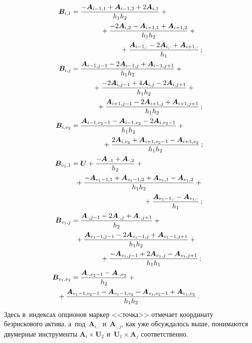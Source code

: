 \begin{multicols}{2}
\noindent
  \begin{align*}
   \bm{B}_{i,1}&= \fr{ -\bm{A}_{i-1,1} +\bm{A}_{i-1,2} +2\bm{A}_{i,1}}{h_1h_2}+{}\\
  &\hspace*{15mm}{}+   \fr{ -2\bm{A}_{i,2} -\bm{A}_{i+1,1} +\bm{A}_{i+1,2}}{h_1h_2}+{}\\
  &\hspace*{25mm}{}+ \fr{ \bm{A}_{i-1,\cdot } - 2\bm{A}_{i,\cdot} +\bm{A}_{i+1,\cdot}}{h_1}\,;\\
  \bm{B}_{i,j} &=\fr{\bm{A}_{i-1,j-1} -2\bm{A}_{i-1,j} +\bm{A}_{i-1,j+1}}{h_1h_2}+{}\\
  &\hspace*{11mm}{}+ \fr{-2\bm{A}_{i,j-1} +4\bm{A}_{i,j} -2\bm{A}_{i,j+1}}{h_1h_2} +{}\\
 &\hspace*{13mm}{}+  \fr{\bm{A}_{i+1,j-1} -2\bm{A}_{i+1,j}+\bm{A}_{i+1,j+1}}{h_1h_2}\,;\\
  \bm{B}_{i,v_2}&= \fr{\bm{A}_{i-1,v_2-1} -\bm{A}_{i-1,v_2} -2\bm{A}_{i,v_2-1}}{h_1h_2} +{}\\
 & \hspace*{16mm}{}+\fr{2\bm{A}_{i,v_2} +\bm{A}_{i+1,v_2-1} -\bm{A}_{i+1,v_2}}{h_1h_2}\,;\\
  \bm{B}_{v_1,1} &=\bm{U} +\fr{ -\bm{A}_{\cdot,1} +\bm{A}_{\cdot, 2}}{h_2}+ {}\\
 & \hspace*{2mm}{}+\fr{-\bm{A}_{v_1-1,1} +\bm{A}_{v_1-1,2} +\bm{A}_{v_1,1} -\bm{A}_{v_1,2}}{h_1h_2} +{}\\
&\hspace*{37mm}{}+\fr{\bm{A}_{v_1-1,\cdot}- \bm{A}_{v_1,\cdot}}{h_1}\,;\\
  \bm{B}_{v_1,j}&= \fr{\bm{A}_{\cdot,j-1}- 2\bm{A}_{\cdot,j} +\bm{A}_{\cdot,j+1}}{h_2} +{}\\
&\hspace*{2mm}{}+\fr{\bm{A}_{v_1-1,j-1}-2\bm{A}_{v_1-1,j}+\bm{A}_{v_1-1,j+1}}{h_1h_2}+{}\\
&\hspace*{15mm}{}+\fr{ -\bm{A}_{v_1,j-1}+2\bm{A}_{v_1,j}-\bm{A}_{v_1,j+1}}{h_1h_1}\,;\\
  \bm{B}_{v_1,v_2}&= \fr{\bm{A}_{\cdot,v_2-1}- \bm{A}_{\cdot,v_2}}{h_2} 
+{}\\
&\hspace*{-7mm}{}+\fr{\bm{A}_{v_1-1, v_2-1}- \bm{A}_{v_1-1,v_2} - \bm{A}_{v_1,v_2-1} 
+\bm{A}_{v_1,v_2}}{h_1h_2}\,.
  \end{align*}
    Здесь в~индексах опционов маркер <<точка>> отмечает координату 
безрискового актива, а~под~$\bm{A}_{i,\cdot}$ и~$\bm{A}_{\cdot,j}$, как уже обсуждалось 
выше, понимаются двумерные инструменты $\bm{A}_i\times \bm{U}_2$ 
и~$\bm{U}_1\times \bm{A}_j$ соответственно. 
  

\end{multicols}
